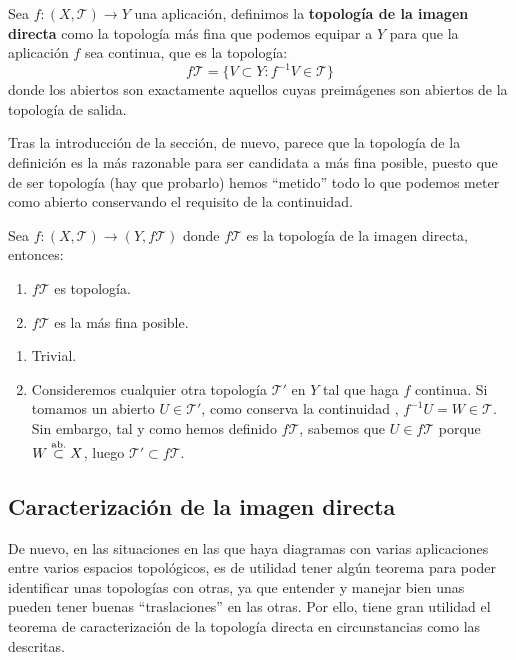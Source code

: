 \begin{defi}
Sea $f: (X,\mathcal{T}) \rightarrow Y$ una aplicación, definimos la \textbf{topología de la imagen directa} como la topología más fina que podemos equipar a $Y$ para que la aplicación $f$ sea continua, que es la topología:
$$
f \mathcal{T} = \{V \subset Y: f^{-1}V \in \mathcal{T}\}
$$
donde los abiertos son exactamente aquellos cuyas preimágenes son abiertos de la topología de salida.
\end{defi}

\begin{obs}
Tras la introducción de la sección, de nuevo, parece que la topología de la definición es la más razonable para ser candidata a más fina posible, puesto que de ser topología (hay que probarlo) hemos ``metido'' todo lo que podemos meter como abierto conservando el requisito de la continuidad.
\end{obs}

\begin{prop}
Sea $f: (X,\mathcal{T}) \rightarrow (Y, f\mathcal{T})$ donde $f\mathcal{T}$ es la topología de la imagen directa, entonces:
\begin{enumerate}
    \item $f\mathcal{T}$ es topología. 
    \item $f\mathcal{T}$ es la más fina posible.
\end{enumerate}
\end{prop}

\begin{demo}
\begin{enumerate}
    \item Trivial.
    \item Consideremos cualquier otra topología $\mathcal{T}'$ en $Y$ tal que haga $f$ continua. Si tomamos un abierto $U \in \mathcal{T}'$, como conserva la continuidad , $f^{-1} U = W \in \mathcal{T}$. Sin embargo, tal y como hemos definido $f \mathcal{T}$, sabemos que $U \in f \mathcal{T}$ porque $W \stackrel{\text{ab.}}{\subset} X$, luego $\mathcal{T}'\subset f\mathcal{T}$.
\end{enumerate}
\end{demo}

\subsection{Caracterización de la imagen directa}
\label{sub:caracterizacion_de_la_imagen_directa}
De nuevo, en las situaciones en las que haya diagramas con varias aplicaciones entre varios espacios topológicos, es de utilidad tener algún teorema para poder identificar unas topologías con otras, ya que entender y manejar bien unas pueden tener buenas ``traslaciones'' en las otras. Por ello, tiene gran utilidad el teorema de caracterización de la topología directa en circunstancias como las descritas.

